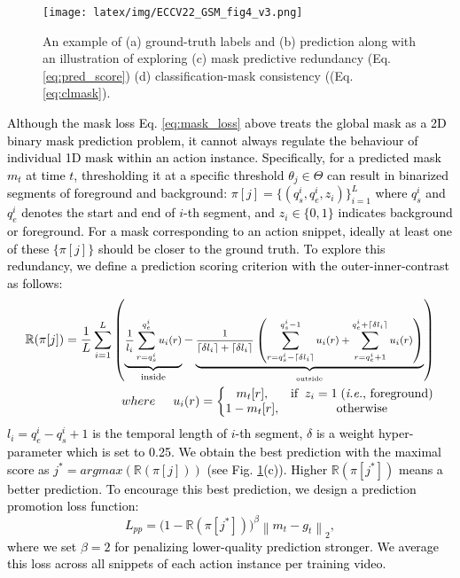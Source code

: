 \documentclass[runningheads]{llncs}
\newcommand{\ie}{\textit{i.e.}}
\begin{document}
 \begin{figure}[t]
\centering
\texttt{[image: latex/img/ECCV22\_GSM\_fig4\_v3.png]}
\caption{\color{black}
An example of (a) ground-truth labels and (b) prediction along with an illustration of exploring (c) mask predictive redundancy (Eq. \eqref{eq:pred_score}) (d) classification-mask consistency ((Eq. \eqref{eq:clmask}).
}
\label{fig:toy_ex}
\end{figure}

\textcolor{black}{Although the mask loss Eq. \eqref{eq:mask_loss} above treats the global mask as a 2D binary mask prediction problem, 
it cannot always regulate the behaviour of individual 1D mask within an action instance.}
\textcolor{black}{
Specifically, for a predicted mask $m_t$ at time $t$,
thresholding it at a specific threshold $\theta_j \in {\Theta}$
can result in {binarized segments of foreground and background}:
$\pi[j] = \{(q_{s}^{i},q_{e}^{i},z_{i})\}_{i=1}^{L}$ where $q^{i}_{s}$ and $q^{i}_{e}$ denotes the start and end of $i$-th segment, and $z_{i} \in \{0,1\}$ indicates background or foreground. 
{For a mask corresponding to an action snippet, ideally  at least one of these $\{\pi[j]\}$ should be closer to the ground truth.}
To explore this redundancy, we define a prediction scoring criterion
with the outer-inner-contrast \cite{shou2018autoloc,lee2021learning} as follows:
}
\begin{equation}
\begin{aligned}\footnotesize
  \mathbb{R}(\pi[j]) =  \frac{1}{L}\sum_{i=1}^{L} \left (    \underbrace{\frac{1}{l_i}\sum_{r=q^{i}_s}^{q^{i}_e}u_i(r) }_{\text{inside}}
- \underbrace{\frac{1}{\left \lceil \delta l_i  \right \rceil + \left \lceil \delta l_i  \right \rceil }\left ( \sum_{r=q^{i}_s - \left \lceil \delta l_i \right \rceil}^{q^{i}_s - 1} u_i(r) + \sum_{r=q^{i}_e +1}^{q^{i}_e + \left \lceil \delta l_i \right \rceil} u_i(r) \right )}_{_{\text{outside}} } \right )
 \\
  where \hspace{0.2in}u_i(r) = \left\{\begin{matrix}
m_{t}[r], &\text{if}\;\; z_i=1 \; \text{(\ie, foreground)}\\ 
 1 - m_{t}[r], & \text{otherwise}
\end{matrix}\right.
 \end{aligned}
 \label{eq:pred_score}
\end{equation}
\textcolor{black}{$l_i = q^{i}_e - q^{i}_s + 1$ is the temporal length of $i$-th segment, $\delta$ is a weight hyper-parameter which is set to 0.25.}
\textcolor{black}{
We obtain the best prediction with the maximal score as 
$j^{*} = argmax(\mathbb{R}(\pi[j]))$ (see Fig. \ref{fig:toy_ex}(c)).
Higher $\mathbb{R}(\pi[j^{*}])$ means 
a better prediction.
To encourage this best prediction,
we design a prediction promotion loss function:
\begin{equation}
    L_{pp} =  \big(1 - \mathbb{R}(\pi[j^{*}])\big)^{\beta} \left \| m_{t} - g_{t} \right \|_{2},
\end{equation}
where we set $\beta=2$ for penalizing lower-quality prediction stronger.
We average this loss across all snippets of each action instance per training video.
}
\end{document}
